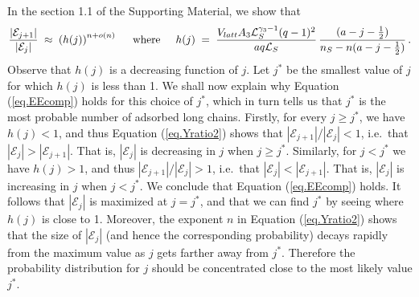 \documentclass[journal=mamobx,manuscript=article]{achemso}
\newcommand{\leng}{\mathcal{L}}
\begin{document}
In the section 1.1 of the Supporting Material, we show that
\begin{equation}
    \label{eq.Yratio2}
       \frac{|\mathcal{E}_{j+1}|}{|\mathcal{E}_j|} \; \approx \; \left( h(j)\right)^{n+o(n)}
       \hspace{5mm}\hbox{where}\hspace{5mm}
      h(j) \;=\;  \frac{ V_{latt}A_3\leng_S^{\gamma_3-1}(q-1)^2}{aq\leng_S} \,
          \frac{(a-j-\frac{1}{2})}{n_S-n(a-j-\frac{1}{2})}   \,.
\end{equation}
Observe that $h(j)$ is a  decreasing function of $j$.
Let $j^*$ be the smallest value of $j$ for which 
$h(j)$ is less than 1. 
We shall now explain why Equation (\ref{eq.EEcomp}) holds 
for this choice of $j^*$, which in turn tells us that
$j^*$ is the most probable 
number of adsorbed long chains.
Firstly, for every $j\geq j^*$, we have $h(j)<1$, 
and thus Equation (\ref{eq.Yratio2}) shows that 
$|\mathcal{E}_{j+1}|/|\mathcal{E}_j|<1$, i.e.\ that 
$|\mathcal{E}_j|>|\mathcal{E}_{j+1}|$.  That is, $|\mathcal{E}_j|$ is decreasing in $j$ when $j\geq j^*$.  
Similarly, for $j<j^*$ we have $h(j)>1$, and thus
$|\mathcal{E}_{j+1}|/|\mathcal{E}_j|> 1$, i.e.\ that
$|\mathcal{E}_j|<|\mathcal{E}_{j+1}|$.  That is, $|\mathcal{E}_j|$ is increasing in $j$ when $j< j^*$.
We conclude that Equation (\ref{eq.EEcomp}) holds.
It follows that $|\mathcal{E}_j|$ is maximized at $j=j^*$, and that we can find $j^*$ by seeing 
where $h(j)$
is close to 1.   
Moreover, the exponent $n$ in Equation (\ref{eq.Yratio2})
shows that the size of $|\mathcal{E}_j|$  (and hence the 
corresponding probability) decays rapidly from the maximum 
value as $j$ gets farther away from $j^*$.  Therefore the probability distribution for $j$ should be concentrated close to the most likely value $j^*$.
\end{document}
